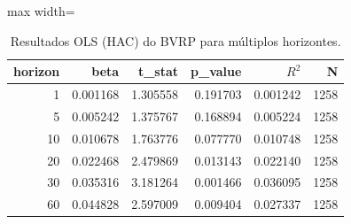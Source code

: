 \begin{table}[H]
\centering
\caption{Resultados OLS (HAC) do BVRP para múltiplos horizontes.}
\label{tab:ols_basico_multihoriz}
\footnotesize
\begin{adjustbox}{max width=\textwidth}
\begin{tabular}{rrrrrr}
\toprule
horizon & beta & t\_stat & p\_value & $R^2$ & N \\
\midrule
1  & 0.001168 & 1.305558 & 0.191703 & 0.001242 & 1258 \\
5  & 0.005242 & 1.375767 & 0.168894 & 0.005224 & 1258 \\
10 & 0.010678 & 1.763776 & 0.077770 & 0.010748 & 1258 \\
20 & 0.022468 & 2.479869 & 0.013143 & 0.022140 & 1258 \\
30 & 0.035316 & 3.181264 & 0.001466 & 0.036095 & 1258 \\
60 & 0.044828 & 2.597009 & 0.009404 & 0.027337 & 1258 \\
\bottomrule
\end{tabular}
\end{adjustbox}
\end{table}
